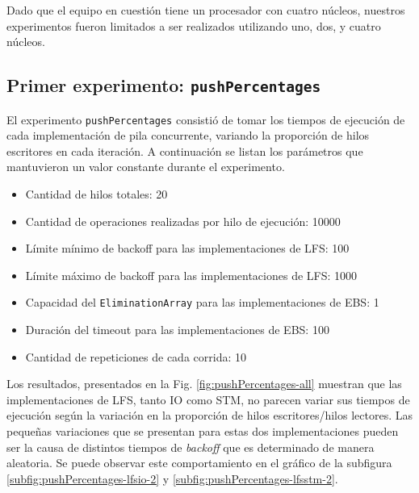 Dado que el equipo en cuestión tiene un procesador con cuatro núcleos, nuestros experimentos fueron limitados a ser realizados utilizando uno, dos, y cuatro núcleos.

\subsection{Primer experimento: \texttt{pushPercentages}}\label{subsec:pushPercentages}
El experimento \texttt{pushPercentages} consistió de tomar los tiempos de ejecución de cada implementación de pila concurrente, variando la proporción de hilos escritores en cada iteración.
A continuación se listan los parámetros que mantuvieron un valor constante durante el experimento.

\begin{itemize}
    \item Cantidad de hilos totales: 20
    \item Cantidad de operaciones realizadas por hilo de ejecución: 10000
    \item Límite mínimo de backoff para las implementaciones de LFS: 100
    \item Límite máximo de backoff para las implementaciones de LFS: 1000
    \item Capacidad del \texttt{EliminationArray} para las implementaciones de EBS: 1
    \item Duración del timeout para las implementaciones de EBS: 100
    \item Cantidad de repeticiones de cada corrida: 10
\end{itemize}

Los resultados, presentados en la Fig. \ref{fig:pushPercentages-all} muestran que las implementaciones de LFS, tanto IO como STM, no parecen variar sus tiempos de ejecución según la variación en la proporción de hilos escritores/hilos lectores.
Las pequeñas variaciones que se presentan para estas dos implementaciones pueden ser la causa de distintos tiempos de \emph{backoff} que es determinado de manera aleatoria. Se puede observar este comportamiento en el gráfico de la subfigura \ref{subfig:pushPercentages-lfsio-2} y \ref{subfig:pushPercentages-lfsstm-2}.

